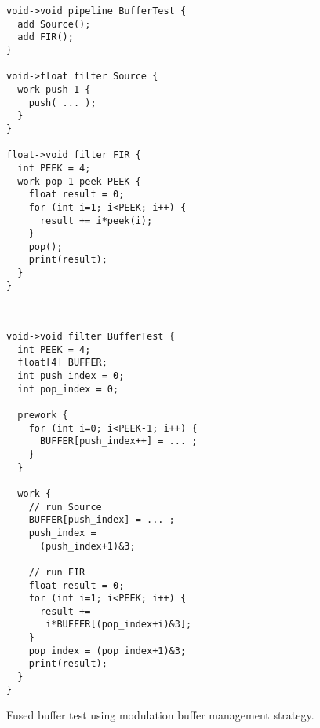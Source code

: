 \begin{figure}[t]

\begin{minipage}{1.6in}
\centering
{\scriptsize
\begin{verbatim}
void->void pipeline BufferTest {
  add Source();                 
  add FIR();                    
}                               
                                
void->float filter Source {     
  work push 1 {                 
    push( ... );             
  } 
}                               
                                
float->void filter FIR {        
  int PEEK = 4;                 
  work pop 1 peek PEEK {        
    float result = 0;           
    for (int i=1; i<PEEK; i++) {
      result += i*peek(i);      
    }                           
    pop();                      
    print(result);              
  }                             
}                               
\end{verbatim}}
\vspace{-6pt}

\caption{Original StreamIt code for the buffer test.\protect\label{fig:code-orig}}
\end{minipage}
~~\vrule~
\begin{minipage}{1.5in}
{\scriptsize
\begin{verbatim}
void->void filter BufferTest {       
  int PEEK = 4;                      
  float[4] BUFFER;                   
  int push_index = 0;                
  int pop_index = 0;                 
                                     
  prework {                          
    for (int i=0; i<PEEK-1; i++) {   
      BUFFER[push_index++] = ... ;
    }                                
  }                                  
                                     
  work {                             
    // run Source                    
    BUFFER[push_index] = ... ;
    push_index =                     
      (push_index+1)&3;              
                                     
    // run FIR                       
    float result = 0;                
    for (int i=1; i<PEEK; i++) {     
      result +=                      
       i*BUFFER[(pop_index+i)&3];    
    }                                
    pop_index = (pop_index+1)&3;     
    print(result);                   
  }                                  
}                                    
\end{verbatim}}
\vspace{-6pt}

\caption{Fused buffer test using modulation buffer management strategy.\protect\label{fig:code-modulation}}
\end{minipage}
\vspace{-12pt}
\end{figure}
